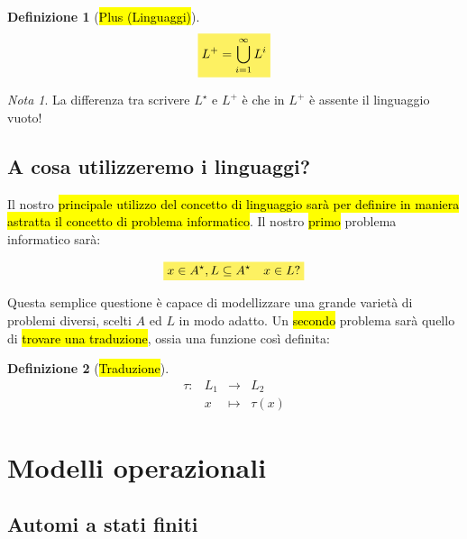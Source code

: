 \documentclass[a4paper,11pt,oneside]{article}
\theoremstyle{plain}
\theoremstyle{definition}
\newtheorem{defn}{Definizione}[section]
\theoremstyle{remark}
\newtheorem*{nota}{Nota}
\newcommand{\mhl}[1]{\colorbox{hlcolor}{$\displaystyle #1$}}
\begin{document}
\begin{defn}[\hl{Plus (Linguaggi)}]\label{def:plus-linguaggi}
  \begin{equation}
    \mhl{ L^+ = \bigcup^{\infty}_{i=1} L^i }
  \end{equation}
\end{defn}

\begin{nota}
  La differenza tra scrivere $L^\star$ e $L^+$ è che in $L^+$ è assente il
  linguaggio vuoto!
\end{nota}

\subsection{A cosa utilizzeremo i linguaggi?}

Il nostro \hl{principale utilizzo del concetto di linguaggio sarà per definire
in maniera astratta il concetto di problema informatico}. Il nostro \hl{primo}
problema informatico sarà:

\begin{equation}
  \mhl{ x \in A^\star, L \subseteq A^\star \quad  x \in L? }
\end{equation}

Questa semplice questione è capace di modellizzare una grande varietà di
problemi diversi, scelti $A$ ed $L$ in modo adatto. Un \hl{secondo} problema sarà
quello di \hl{trovare una traduzione}, ossia una funzione così definita:

\begin{defn}[\hl{Traduzione}]\label{def:traduzione}
  \begin{equation}
    \begin{array}{cccc}
      \tau: & L_1 & \to     & L_2 \\
            & x   & \mapsto & \tau(x)
    \end{array}
  \end{equation}
\end{defn}

\section{Modelli operazionali}\label{sec:modelli-operazionali}

\subsection{Automi a stati finiti}\label{sec:fsa}
\end{document}
